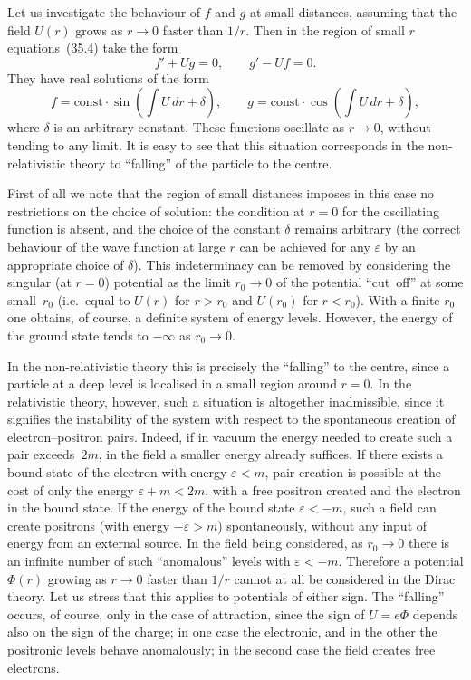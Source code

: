 Let us investigate the behaviour of $f$ and $g$ at small distances, assuming that the field $U(r)$ grows as $r\to 0$ faster than $1/r$. Then in the region of small $r$ equations~(35.4) take the form
\[
f' + Ug = 0,\qquad g' - Uf = 0.
\]
They have real solutions of the form
\begin{equation}
f = \mathrm{const}\cdot\sin\!\left(\int\!U\,dr + \delta\right),\qquad
g = \mathrm{const}\cdot\cos\!\left(\int\!U\,dr + \delta\right),
\tag{35.6}
\end{equation}
where $\delta$ is an arbitrary constant. These functions oscillate as $r\to 0$, without tending to any limit. It is easy to see that this situation corresponds in the non-relativistic theory to ``falling'' of the particle to the centre.

First of all we note that the region of small distances imposes in this case no restrictions on the choice of solution: the condition at $r = 0$ for the oscillating function is absent, and the choice of the constant $\delta$ remains arbitrary (the correct behaviour of the wave function at large $r$ can be achieved for any $\varepsilon$ by an appropriate choice of $\delta$). This indeterminacy can be removed by considering the singular (at $r = 0$) potential as the limit $r_0\to 0$ of the potential ``cut~off'' at some small~$r_0$ (i.e.\ equal to $U(r)$ for $r > r_0$ and $U(r_0)$ for $r < r_0$). With a finite $r_0$ one obtains, of course, a definite system of energy levels. However, the energy of the ground state tends to $-\infty$ as $r_0\to 0$.

In the non-relativistic theory this is precisely the ``falling'' to the centre, since a particle at a deep level is localised in a small region around $r = 0$. In the relativistic theory, however, such a situation is altogether inadmissible, since it signifies the instability of the system with respect to the spontaneous creation of electron--positron pairs. Indeed, if in vacuum the energy needed to create such a pair exceeds~$2m$, in the field a smaller energy already suffices. If there exists a bound state of the electron with energy $\varepsilon < m$, pair creation is possible at the cost of only the energy $\varepsilon + m < 2m$, with a free positron created and the electron in the bound state. If the energy of the bound state $\varepsilon < -m$, such a field can create positrons (with energy $-\varepsilon > m$) spontaneously, without any input of energy from an external source. In the field being considered, as $r_0\to 0$ there is an infinite number of such ``anomalous'' levels with $\varepsilon < -m$. Therefore a potential $\Phi(r)$ growing as $r\to 0$ faster than $1/r$ cannot at all be considered in the Dirac theory. Let us stress that this applies to potentials of either sign. The ``falling'' occurs, of course, only in the case of attraction, since the sign of $U = e\Phi$ depends also on the sign of the charge; in one case the electronic, and in the other the positronic levels behave anomalously; in the second case the field creates free electrons.

